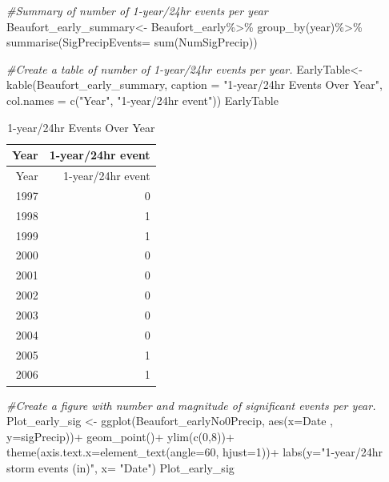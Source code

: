 \documentclass[
  12pt,
]{article}
\newenvironment{Shaded}{\begin{snugshade}}{\end{snugshade}}
\newcommand{\AttributeTok}[1]{\textcolor[rgb]{0.77,0.63,0.00}{#1}}
\newcommand{\CommentTok}[1]{\textcolor[rgb]{0.56,0.35,0.01}{\textit{#1}}}
\newcommand{\DecValTok}[1]{\textcolor[rgb]{0.00,0.00,0.81}{#1}}
\newcommand{\FunctionTok}[1]{\textcolor[rgb]{0.00,0.00,0.00}{#1}}
\newcommand{\NormalTok}[1]{#1}
\newcommand{\OtherTok}[1]{\textcolor[rgb]{0.56,0.35,0.01}{#1}}
\newcommand{\SpecialCharTok}[1]{\textcolor[rgb]{0.00,0.00,0.00}{#1}}
\newcommand{\StringTok}[1]{\textcolor[rgb]{0.31,0.60,0.02}{#1}}
\begin{document}
\begin{Shaded}
\begin{Highlighting}[]
\CommentTok{\#Summary of number of 1{-}year/24hr events per year}
\NormalTok{Beaufort\_early\_summary}\OtherTok{\textless{}{-}}\NormalTok{ Beaufort\_early}\SpecialCharTok{\%\textgreater{}\%}
  \FunctionTok{group\_by}\NormalTok{(year)}\SpecialCharTok{\%\textgreater{}\%}
  \FunctionTok{summarise}\NormalTok{(}\AttributeTok{SigPrecipEvents=} \FunctionTok{sum}\NormalTok{(NumSigPrecip))}

\CommentTok{\#Create a table of number of 1{-}year/24hr events per year.}
\NormalTok{EarlyTable}\OtherTok{\textless{}{-}} \FunctionTok{kable}\NormalTok{(Beaufort\_early\_summary, }
                   \AttributeTok{caption =} \StringTok{"1{-}year/24hr Events Over Year"}\NormalTok{, }
                   \AttributeTok{col.names =} \FunctionTok{c}\NormalTok{(}\StringTok{"Year"}\NormalTok{, }\StringTok{"1{-}year/24hr event"}\NormalTok{))}
\NormalTok{EarlyTable}
\end{Highlighting}
\end{Shaded}

\begin{longtable}[]{@{}rr@{}}
\caption{1-year/24hr Events Over Year}\tabularnewline
\toprule
Year & 1-year/24hr event \\
\midrule
\endfirsthead
\toprule
Year & 1-year/24hr event \\
\midrule
\endhead
1997 & 0 \\
1998 & 1 \\
1999 & 1 \\
2000 & 0 \\
2001 & 0 \\
2002 & 0 \\
2003 & 0 \\
2004 & 0 \\
2005 & 1 \\
2006 & 1 \\
\bottomrule
\end{longtable}

\newpage

\begin{Shaded}
\begin{Highlighting}[]
\CommentTok{\#Create a figure with number and magnitude of significant events per year.}
\NormalTok{Plot\_early\_sig }\OtherTok{\textless{}{-}} \FunctionTok{ggplot}\NormalTok{(Beaufort\_earlyNo0Precip, }
                         \FunctionTok{aes}\NormalTok{(}\AttributeTok{x=}\NormalTok{Date , }\AttributeTok{y=}\NormalTok{sigPrecip))}\SpecialCharTok{+}
  \FunctionTok{geom\_point}\NormalTok{()}\SpecialCharTok{+}
  \FunctionTok{ylim}\NormalTok{(}\FunctionTok{c}\NormalTok{(}\DecValTok{0}\NormalTok{,}\DecValTok{8}\NormalTok{))}\SpecialCharTok{+}
   \FunctionTok{theme}\NormalTok{(}\AttributeTok{axis.text.x=}\FunctionTok{element\_text}\NormalTok{(}\AttributeTok{angle=}\DecValTok{60}\NormalTok{, }\AttributeTok{hjust=}\DecValTok{1}\NormalTok{))}\SpecialCharTok{+}
  \FunctionTok{labs}\NormalTok{(}\AttributeTok{y=}\StringTok{"1{-}year/24hr storm events (in)"}\NormalTok{, }\AttributeTok{x=} \StringTok{"Date"}\NormalTok{)}
\NormalTok{Plot\_early\_sig}
\end{Highlighting}
\end{Shaded}
\end{document}
